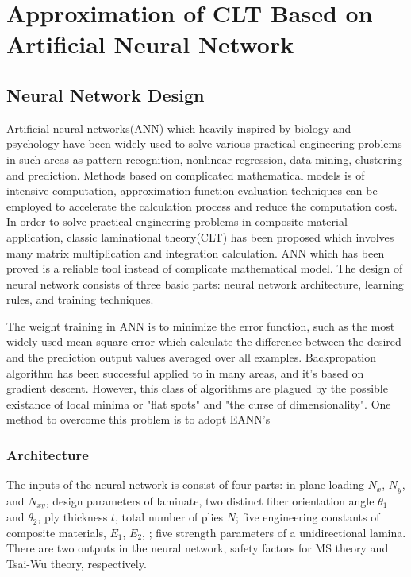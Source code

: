 
\chapter{Approximation of CLT Based on Artificial Neural Network} %

\label{Chapter5} %


\section{Neural Network Design}
Artificial neural networks(ANN) which heavily inspired by biology and psychology
have been widely used to solve various practical engineering problems in such
areas as pattern recognition, nonlinear regression, data mining, clustering and
prediction. Methods based on complicated mathematical models is of intensive
computation, approximation function evaluation techniques can be employed to
accelerate the calculation process and reduce the computation cost. In order to
solve practical engineering problems in composite material application, classic
laminational theory(CLT) has been proposed which involves many matrix
multiplication and integration calculation. ANN which has been proved is a
reliable tool instead of complicate mathematical model.  The design of neural
network consists of three basic parts: neural network architecture, learning
rules, and training techniques.

The weight training in ANN is to minimize the error function, such as the most
widely used mean square error which calculate the difference  between the
desired and the prediction output values averaged over all examples.
Backpropation algorithm has been successful applied to in many areas, and it's
based on gradient descent. However, this class of algorithms are  plagued by the
possible existance of local minima or "flat spots" and "the curse of
dimensionality". One method to overcome this problem is to adopt EANN's 

\subsection{Architecture}
The inputs of the neural network is consist of four parts: in-plane loading
$N_x$, $N_y$, and $N_{xy}$, design parameters of laminate, two distinct fiber
orientation angle $\theta_1$ and $\theta_2$, ply thickness $t$, total number of
plies $N$; five engineering constants of composite materials, $E_1$, $E_2$, ;
five strength parameters of a unidirectional lamina. There are two outputs in
the neural network, safety factors for MS theory and Tsai-Wu theory, respectively.




